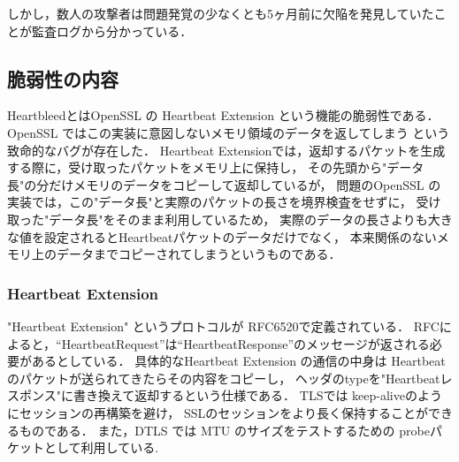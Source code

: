 しかし，数人の攻撃者は問題発覚の少なくとも5ヶ月前に欠陥を発見していたことが監査ログから分かっている\cite{ars}\cite{erratasecurity}．


\subsection{脆弱性の内容}
HeartbleedとはOpenSSL の Heartbeat Extension という機能の脆弱性である．
OpenSSL ではこの実装に意図しないメモリ領域のデータを返してしまう という致命的なバグが存在した．
Heartbeat Extensionでは，返却するパケットを生成する際に，受け取ったパケットをメモリ上に保持し，
その先頭から"データ長"の分だけメモリのデータをコピーして返却しているが，
問題のOpenSSL の実装では，この"データ長"と実際のパケットの長さを境界検査をせずに，
受け取った"データ長"をそのまま利用しているため，
実際のデータの長さよりも大きな値を設定されるとHeartbeatパケットのデータだけでなく，
本来関係のないメモリ上のデータまでコピーされてしまうというものである．


\subsubsection{Heartbeat Extension}
"Heartbeat Extension" というプロトコルが RFC6520\cite{rfc6520}で定義されている．
RFCによると，``HeartbeatRequest''は``HeartbeatResponse''のメッセージが返される必要があるとしている．
具体的なHeartbeat Extension の通信の中身は Heartbeat のパケットが送られてきたらその内容をコピーし，
ヘッダのtypeを"Heartbeatレスポンス"に書き換えて返却するという仕様である．
TLSでは keep-aliveのようにセッションの再構築を避け，
SSLのセッションをより長く保持することができるものである．
また，DTLS では MTU のサイズをテストするための probeパケットとして利用している.


